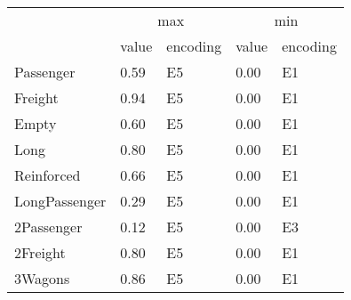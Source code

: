 \begin{tabular}{lllll}
\toprule
 & \multicolumn{2}{c}{max} & \multicolumn{2}{c}{min} \\
 & value & encoding & value & encoding \\
\midrule
Passenger & 0.59 & E5 & 0.00 & E1 \\
Freight & 0.94 & E5 & 0.00 & E1 \\
Empty & 0.60 & E5 & 0.00 & E1 \\
Long & 0.80 & E5 & 0.00 & E1 \\
Reinforced & 0.66 & E5 & 0.00 & E1 \\
LongPassenger & 0.29 & E5 & 0.00 & E1 \\
2Passenger & 0.12 & E5 & 0.00 & E3 \\
2Freight & 0.80 & E5 & 0.00 & E1 \\
3Wagons & 0.86 & E5 & 0.00 & E1 \\
\bottomrule
\end{tabular}
